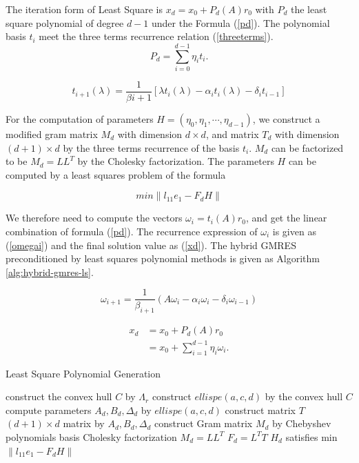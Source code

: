{The iteration form of Least Square is \(x_d=x_0+P_d(A)r_0\) with \(P_d\) the least square polynomial of degree \(d-1\) under the Formula (\ref{pd}). The polynomial basis \(t_i\) meet the three terms recurrence relation (\ref{threeterms}). 
\begin{equation}
\label{pd}
P_d=\sum_{i=0}^{d-1}\eta_it_i.
\end{equation}

\begin{equation}
\label{threeterms}
t_{i+1}(\lambda)=\frac{1}{\beta i+1}[\lambda t_i(\lambda)-\alpha_i t_i(\lambda)-\delta_i t_{i-1}]
\end{equation}

For the computation of parameters $H=(\eta_0,\eta_1,\cdots,\eta_{d-1})$, we construct a modified gram matrix $M_d$ with dimension $d \times d$, and matrix $T_d$ with dimension $(d+1) \times d$ by the three terms recurrence of the basis $t_i$. $M_d$ can be factorized to be $M_d=LL^T$ by the Cholesky factorization. The parameters $H$ can be computed by a least squares problem of the formula


\begin{equation}
\label{eq112}
min \|l_{11}e_1-F_d H\|
\end{equation}

We therefore need to compute the vectors \(\omega_i=t_i(A)r_0\), and get the linear combination of formula (\ref{pd}). The recurrence expression of $ \omega_i$ is given as (\ref{omegai}) and the final solution value as (\ref{xd}). The hybrid GMRES preconditioned by least squares polynomial methods is given as Algorithm \ref{alg:hybrid-gmres-ls}.

\begin{equation}
\label{omegai}
\omega_{i+1}=\frac{1}{\beta_{i+1}}(A\omega_i-\alpha_i\omega_i-\delta_i\omega_{i-1})
\end{equation}

\begin{equation}
\begin{aligned}
\label{xd}
x_d &=x_0+P_d(A)r_0 \\ &=x_0+\sum_{i=1}^{d-1}\eta_i\omega_i.
\end{aligned}
\end{equation}

\begin{algorithm}[htbp]
	\caption{Least Square Polynomial Generation}
	\label{alg:lsqr-parameters}
	\begin{algorithmic}[1]
		\State construct the convex hull $C$ by $\Lambda_r$
		\State construct $ellispe(a,c,d)$ by the convex hull $C$
		\State compute parameters $A_d, B_d, \Delta_d$ by $ellispe(a,c,d)$
		\State construct matrix $T$ ${(d+1)} \times d$ matrix by $A_d, B_d, \Delta_d$
		\State construct Gram matrix $M_d$ by Chebyshev polynomials basis
		\State Cholesky factorization $M_d=LL^T$
		\State $F_d=L^TT$
		\State $H_d$ satisfies min $\|l_{11}e_1-F_d H\|$
		\EndFunction
	\end{algorithmic}
\end{algorithm}

}
